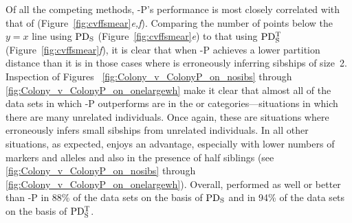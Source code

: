 \documentclass[11pt]{article}
\begin{document}
{    
Of all the competing methods, \colony-P's performance is most closely correlated with that of \colony{} 
(Figure~\ref{fig:cvffsmear}{\em e,f}).  Comparing the number of points below the $y=x$ line using $\mathrm{PD_S}
$ (Figure~\ref{fig:cvffsmear}{\em e}) to that using $\mathrm{PD_S^T}$ (Figure~\ref{fig:cvffsmear}{\em f}), it is 
clear that when \colony{}-P achieves a lower partition distance than \colony{} it is in those cases 
where \colony{} is erroneously inferring sibships of size~2.  Inspection of Figures~
\ref{fig:Colony_v_ColonyP_on_nosibs} through \ref{fig:Colony_v_ColonyP_on_onelargewh} make it clear 
that almost all of the data sets in which \colony{}-P outperforms \colony{} are in the \nosibs{} or 
\onelargenoh{} categories---situations in which there are many unrelated individuals.  Once again, 
these are situations where \colony{} erroneously infers small sibships from unrelated individuals.  In 
all other situations, as expected, \colony{} enjoys an advantage, especially with lower numbers of 
markers and alleles and also in the presence of half siblings (see \ref{fig:Colony_v_ColonyP_on_nosibs} 
through \ref{fig:Colony_v_ColonyP_on_onelargewh}). Overall, \colony{} performed as well or better than 
\colony{}-P in 88\% of the data sets on the basis of $\mathrm{PD_S}$ and in 94\% of the data sets on the basis 
of $\mathrm{PD_S^T}$.

}
\end{document}
